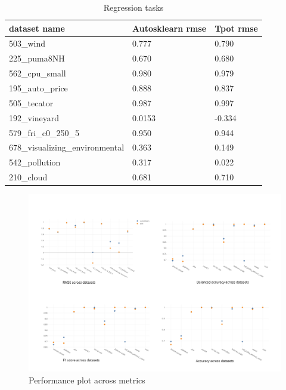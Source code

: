 \begin{table}[]
\centering
\begin{tabular}{|l|l|l|}
\hline
dataset name                    & \multicolumn{1}{c|}{Autosklearn rmse} & Tpot rmse \\ \hline
503\_wind                       & 0.777                                 & 0.790     \\ \hline
225\_puma8NH                    & 0.670                                 & 0.680     \\ \hline
562\_cpu\_small                 & 0.980                                 & 0.979     \\ \hline
195\_auto\_price                & 0.888                                 & 0.837     \\ \hline
505\_tecator                    & 0.987                                 & 0.997     \\ \hline
192\_vineyard                   & 0.0153                                & -0.334    \\ \hline
579\_fri\_c0\_250\_5            & 0.950                                 & 0.944     \\ \hline
678\_visualizing\_environmental & 0.363                                 & 0.149     \\ \hline
542\_pollution                  & 0.317                                 & 0.022     \\ \hline
210\_cloud                      & 0.681                                 & 0.710     \\ \hline
\end{tabular}
\caption{Regression tasks}
\label{tbl:regression_tasks}
\end{table}

\begin{figure}[!h]
    	\centering
    	\includegraphics[width=0.9\linewidth]{thesis_template/images/performanceplot.png}
    	\caption{Performance plot across metrics}
    	\label{fig:performance}
        \end{figure}
        

